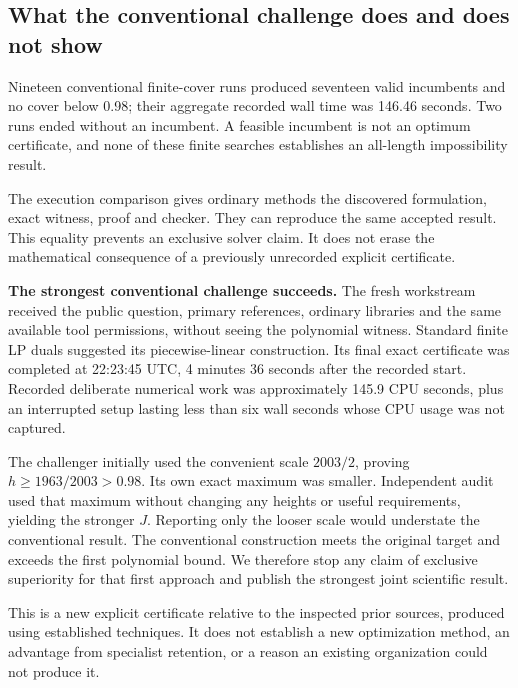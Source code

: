 \documentclass[11pt,a4paper]{article}
\begin{document}

\hypertarget{what-the-conventional-challenge-does-and-does-not-show}{%
\subsection{What the conventional challenge does and does not
show}\label{what-the-conventional-challenge-does-and-does-not-show}}

Nineteen conventional finite-cover runs produced seventeen valid
incumbents and no cover below 0.98; their aggregate recorded wall time
was 146.46 seconds. Two runs ended without an incumbent. A feasible
incumbent is not an optimum certificate, and none of these finite
searches establishes an all-length impossibility result.

The execution comparison gives ordinary methods the discovered
formulation, exact witness, proof and checker. They can reproduce the
same accepted result. This equality prevents an exclusive solver claim.
It does not erase the mathematical consequence of a previously
unrecorded explicit certificate.

\textbf{The strongest conventional challenge succeeds.} The fresh
workstream received the public question, primary references, ordinary
libraries and the same available tool permissions, without seeing the
polynomial witness. Standard finite LP duals suggested its
piecewise-linear construction. Its final exact certificate was completed
at 22:23:45 UTC, 4 minutes 36 seconds after the recorded start. Recorded
deliberate numerical work was approximately 145.9 CPU seconds, plus an
interrupted setup lasting less than six wall seconds whose CPU usage was
not captured.

The challenger initially used the convenient scale \(2003/2\), proving
\(h\ge1963/2003>0.98\). Its own exact maximum was smaller. Independent
audit used that maximum without changing any heights or useful
requirements, yielding the stronger \(J\). Reporting only the looser
scale would understate the conventional result. The conventional
construction meets the original target and exceeds the first polynomial
bound. We therefore stop any claim of exclusive superiority for that
first approach and publish the strongest joint scientific result.

This is a new explicit certificate relative to the inspected prior
sources, produced using established techniques. It does not establish a
new optimization method, an advantage from specialist retention, or a
reason an existing organization could not produce it.
\end{document}
